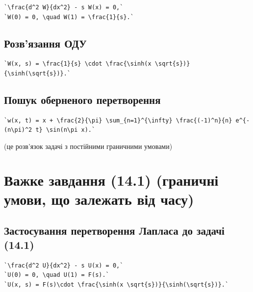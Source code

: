 \documentclass[
  ukrainian,
]{article}
\begin{document}
\begin{verbatim}
`\frac{d^2 W}{dx^2} - s W(x) = 0,`
`W(0) = 0, \quad W(1) = \frac{1}{s}.`
\end{verbatim}

\subsection{Розв'язання
ОДУ}\label{ux440ux43eux437ux432ux44fux437ux430ux43dux43dux44f-ux43eux434ux443}

\begin{verbatim}
`W(x, s) = \frac{1}{s} \cdot \frac{\sinh(x \sqrt{s})}{\sinh(\sqrt{s})}.`
\end{verbatim}

\subsection{Пошук оберненого
перетворення}\label{ux43fux43eux448ux443ux43a-ux43eux431ux435ux440ux43dux435ux43dux43eux433ux43e-ux43fux435ux440ux435ux442ux432ux43eux440ux435ux43dux43dux44f}

\begin{verbatim}
`w(x, t) = x + \frac{2}{\pi} \sum_{n=1}^{\infty} \frac{(-1)^n}{n} e^{-(n\pi)^2 t} \sin(n\pi x).`
\end{verbatim}

(це розв'язок задачі з постійними граничними умовами)

\section{Важке завдання (14.1) (граничні умови, що залежать від
часу)}\label{ux432ux430ux436ux43aux435-ux437ux430ux432ux434ux430ux43dux43dux44f-14.1-ux433ux440ux430ux43dux438ux447ux43dux456-ux443ux43cux43eux432ux438-ux449ux43e-ux437ux430ux43bux435ux436ux430ux442ux44c-ux432ux456ux434-ux447ux430ux441ux443}

\subsection{Застосування перетворення Лапласа до задачі
(14.1)}\label{ux437ux430ux441ux442ux43eux441ux443ux432ux430ux43dux43dux44f-ux43fux435ux440ux435ux442ux432ux43eux440ux435ux43dux43dux44f-ux43bux430ux43fux43bux430ux441ux430-ux434ux43e-ux437ux430ux434ux430ux447ux456-14.1}

\begin{verbatim}
`\frac{d^2 U}{dx^2} - s U(x) = 0,`
`U(0) = 0, \quad U(1) = F(s).`
`U(x, s) = F(s)\cdot \frac{\sinh(x \sqrt{s})}{\sinh(\sqrt{s})}.`
\end{verbatim}
\end{document}
